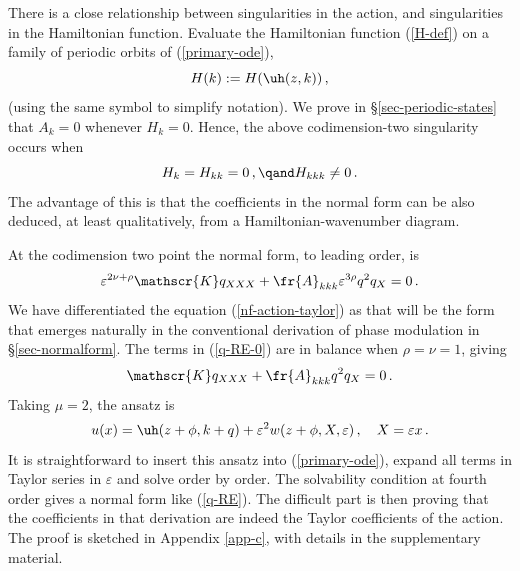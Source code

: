 \documentclass[10pt]{article}
\def\eps{{\varepsilon}} \def\reps{\textcolor{red}{{\varepsilon}}}
\begin{document}
There is a close relationship between singularities in the action, and
singularities in the Hamiltonian function.  Evaluate the Hamiltonian function
(\ref{H-def}) on a family of periodic orbits of (\ref{primary-ode}),
%
\begin{equation}\label{H-def-k}
H(k) := H(\uh(z,k))\,,
\end{equation}
%
(using the same symbol to simplify notation). We prove in \S\ref{sec-periodic-states} that $A_k=0$ whenever $H_k=0$.  Hence, the above codimension-two
singularity occurs when
%
\begin{equation}\label{energy-inflection}
H_k = H_{kk}=0\,,\qand H_{kkk}\neq 0 \,.
\end{equation}
%
The advantage of this is that the coefficients in the normal form can be also
deduced, at least qualitatively, from a Hamiltonian-wavenumber diagram.

At the codimension two point the normal form, to leading order, is
%
\begin{equation}\label{q-RE-0}
\eps^{2\nu+\rho}\mathscr{K} q_{XXX} + \fr {A}_{kkk}\eps^{3\rho} q^2q_X= 0 \,.
\end{equation}
%
We have differentiated the equation (\ref{nf-action-taylor}) as that will be the
form that emerges naturally in the conventional derivation of phase modulation
in \S\ref{sec-normalform}. The terms in (\ref{q-RE-0}) are in balance when
$\rho=\nu=1$, giving
%
\begin{equation}\label{q-RE}
\mathscr{K} q_{XXX} + \fr {A}_{kkk} q^2q_X= 0 \,.
\end{equation}
%
Taking $\mu=2$, the ansatz is
%
\begin{equation}\label{uhat-modulation}
u(x) = \uh(z+\phi,k+ q) + \eps^2 w(z+\phi,X,\eps)\,,\quad X=\eps x\,.
\end{equation}
%
It is straightforward to insert this ansatz into (\ref{primary-ode}), expand all
terms in Taylor series in $\eps$ and solve order by order.  The solvability
condition at fourth order gives a normal form like (\ref{q-RE}).  The difficult
part is then proving that the coefficients in that derivation are indeed the Taylor
coefficients of the action. The proof is sketched in Appendix \ref{app-c}, with details in the supplementary material.
\end{document}
